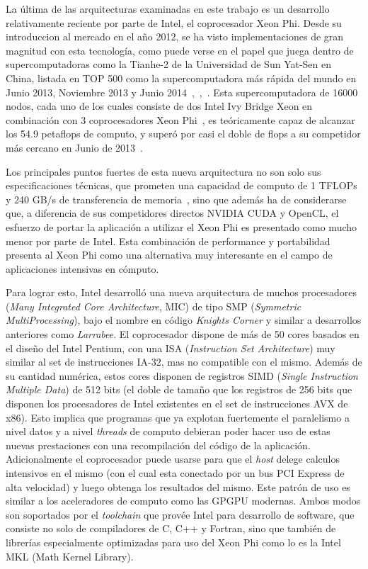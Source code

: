 La \'ultima de las arquitecturas examinadas en este trabajo es un desarrollo relativamente reciente
por parte de Intel, el coprocesador Xeon Phi. Desde su introduccion al mercado en el a\~no 2012, se ha visto implementaciones de gran magnitud con esta tecnolog\'ia, como puede verse en el papel que juega dentro de supercomputadoras como la Tianhe-2 de la Universidad de Sun Yat-Sen en China,
listada en TOP 500 como la supercomputadora más r\'apida del mundo en Junio 2013, Noviembre 2013 y
Junio 2014~\cite{Top500XeonPhiJune2013},~\cite{Top500XeonPhiNov2013},~\cite{Top500XeonPhiJune2014}. Esta supercomputadora de 16000 nodos, cada uno de los cuales consiste de dos Intel
Ivy Bridge Xeon en combinaci\'on con 3 coprocesadores Xeon Phi~\cite{Top500XeonPhiJune2013}, es te\'oricamente capaz de alcanzar los
54.9 petaflops de computo, y super\'o por casi el doble de flops a su competidor m\'as cercano en
Junio de 2013~\cite{Top500XeonPhiJune2013}.

Los principales puntos fuertes de esta nueva arquitectura no son solo sus especificaciones t\'ecnicas, que prometen una
capacidad de computo de 1 TFLOPs y 240 GB/s de transferencia de memoria~\cite{Fang}, sino que adem\'as ha de considerarse
que, a diferencia de sus competidores directos NVIDIA CUDA y OpenCL, el esfuerzo de portar la aplicaci\'on a utilizar
el Xeon Phi es presentado como mucho menor por parte de Intel. Esta combinación de performance y portabilidad
presenta al Xeon Phi como una alternativa muy interesante en el campo de aplicaciones intensivas en c\'omputo.

Para lograr esto, Intel desarroll\'o una nueva arquitectura de muchos procesadores (\textit{Many Integrated Core Architecture}, MIC) de
tipo SMP (\textit{Symmetric MultiProcessing}), bajo el nombre en c\'odigo \textit{Knights Corner} y similar a desarrollos anteriores como \textit{Larrabee}. El coprocesador dispone de m\'as de 50 cores basados en el dise\~no del Intel Pentium, con una ISA (\textit{Instruction Set Architecture}) muy similar al set de instrucciones IA-32, mas no compatible con el mismo. Adem\'as de su cantidad
num\'erica, estos cores disponen de registros SIMD (\textit{Single Instruction Multiple Data}) de 512 bits (el doble de tama\~no que los registros de 256
bits que disponen los procesadores de Intel existentes en el set de instrucciones AVX de x86). Esto implica que programas
que ya explotan fuertemente el paralelismo a nivel datos y a nivel \textit{threads} de computo debieran poder hacer uso de
estas nuevas prestaciones con una recompilaci\'on del c\'odigo de la aplicaci\'on. Adicionalmente el coprocesador puede usarse para que el
\textit{host} delege calculos intensivos en el mismo (con el cual esta conectado por un bus
PCI Express de alta velocidad) y luego obtenga los resultados del mismo. Este patr\'on de uso es similar a los aceleradores de computo como las GPGPU modernas. Ambos modos son soportados por el \textit{toolchain} que prov\'ee Intel para desarrollo de software, que consiste no solo de compiladores de C, C++ y Fortran, sino que también de librer\'ias especialmente optimizadas para uso del Xeon Phi como lo es la Intel MKL (Math Kernel Library).~\cite{IntelXeonPhiWhitePaper}

